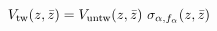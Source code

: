 \begin{equation}
V_{\rm tw}(z,\bar z)= V_{\rm untw}(z,\bar z)~\sigma_{\alpha, f_\alpha}(z,\bar z)
\end{equation}

